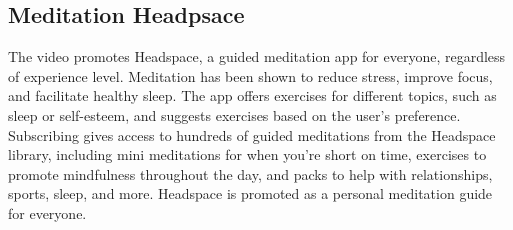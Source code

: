 \documentclass{article}
\begin{document}
\subsection{Meditation Headpsace}
The video promotes Headspace, a guided meditation app for everyone, regardless of experience level. Meditation has been shown to reduce stress, improve focus, and facilitate healthy sleep. The app offers exercises for different topics, such as sleep or self-esteem, and suggests exercises based on the user's preference. Subscribing gives access to hundreds of guided meditations from the Headspace library, including mini meditations for when you're short on time, exercises to promote mindfulness throughout the day, and packs to help with relationships, sports, sleep, and more. Headspace is promoted as a personal meditation guide for everyone.
\end{document}
